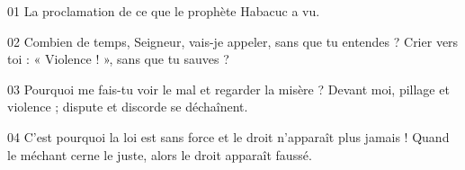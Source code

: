 01 La proclamation de ce que le prophète Habacuc a vu.

02 Combien de temps, Seigneur, vais-je appeler, sans que tu entendes ? Crier vers toi : « Violence ! », sans que tu sauves ?

03 Pourquoi me fais-tu voir le mal et regarder la misère ? Devant moi, pillage et violence ; dispute et discorde se déchaînent.

04 C’est pourquoi la loi est sans force et le droit n’apparaît plus jamais ! Quand le méchant cerne le juste, alors le droit apparaît faussé.
